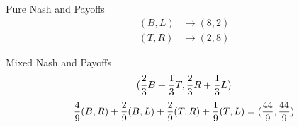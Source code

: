 \documentclass[
  course = {{IE579 Game Theory and Multi-Agent Reinforcement Learning}},
  assignment = 1,
  name = {{Mohammad Mahdi Rahimi}},
  studentnumber = {{20208244}},
  email = {{mahi@kaist.ac.kr}},
  firstexercise = 1
]{aga-homework}
\begin{document}
\exercise
\subexercise Pure Nash and Payoffs
\\
\begin{equation} \label{eq1}
\begin{split}
(B, L) & \rightarrow (8, 2)\\
(T, R) & \rightarrow (2, 8)
\end{split}
\end{equation}

\subexercise Mixed Nash and Payoffs
\begin{equation} \label{eq1}
\begin{split}
({2 \over 3}B + {1 \over 3} T, {2 \over 3}R + {1 \over 3}L)
\end{split}
\end{equation}
\begin{equation} \label{eq1}
\begin{split}
{4 \over 9}(B,R) + {2 \over 9}(B, L) + {2 \over 9}(T, R) + {1 \over 9}(T, L) = ({44 \over 9}, {44 \over 9})
\end{split}
\end{equation}
\end{document}
